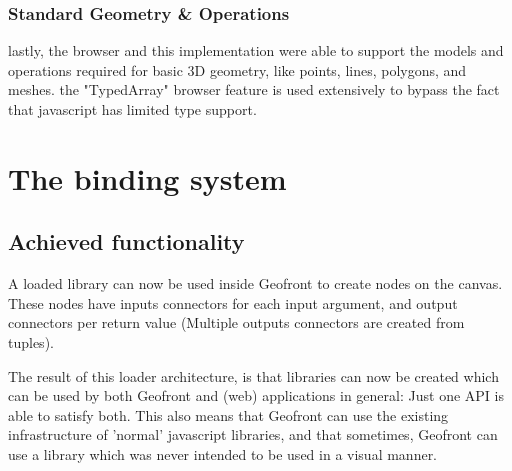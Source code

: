 \subsubsection*{Standard Geometry \& Operations}
lastly, the browser and this implementation were able to support the models and operations required for basic 3D geometry, like points, lines, polygons, and meshes.
the "TypedArray" browser feature is used extensively to bypass the fact that javascript has limited type support.


\newpage

\section{The binding system}
\label{sec:implementation:loading}

\subsection{Achieved functionality}
A loaded library can now be used inside Geofront to create nodes on the canvas. 
These nodes have inputs connectors for each input argument, and output connectors per return value (Multiple outputs connectors are created from tuples). 

The result of this loader architecture, is that libraries can now be created which can be used by both Geofront and (web) applications in general:
Just one API is able to satisfy both.
This also means that Geofront can use the existing infrastructure of 'normal' javascript libraries, and that sometimes, Geofront can use a library which was never intended to be used in a visual manner. 

